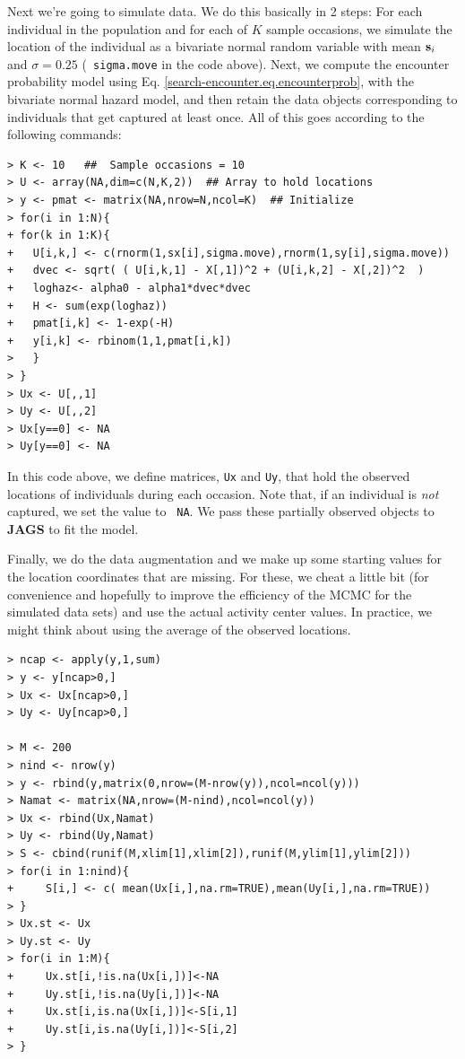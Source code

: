 Next we're going to simulate data. We do this basically in 2 steps:
For each individual in the population and for each of $K$ sample
occasions, we simulate the location of the individual as a bivariate
normal random variable with mean ${\bf s}_i$ and $\sigma = 0.25$ ({\tt
  sigma.move} in the code above). Next, we compute the encounter
probability model using Eq. \ref{search-encounter.eq.encounterprob},
with the bivariate normal hazard model, 
and then retain the data objects corresponding to individuals that get
captured at least once. All of this goes according to the following
commands: 
{\small
\begin{verbatim}
> K <- 10   ##  Sample occasions = 10
> U <- array(NA,dim=c(N,K,2))  ## Array to hold locations
> y <- pmat <- matrix(NA,nrow=N,ncol=K)  ## Initialize
> for(i in 1:N){
+ for(k in 1:K){
+   U[i,k,] <- c(rnorm(1,sx[i],sigma.move),rnorm(1,sy[i],sigma.move))
+   dvec <- sqrt( ( U[i,k,1] - X[,1])^2 + (U[i,k,2] - X[,2])^2  )
+   loghaz<- alpha0 - alpha1*dvec*dvec   
+   H <- sum(exp(loghaz))
+   pmat[i,k] <- 1-exp(-H)
+   y[i,k] <- rbinom(1,1,pmat[i,k])
>   }
> }
> Ux <- U[,,1]
> Uy <- U[,,2]
> Ux[y==0] <- NA
> Uy[y==0] <- NA
\end{verbatim}
}

In this code above, we define matrices, \mbox{\tt Ux} and
\mbox{\tt Uy}, that hold the 
observed locations of individuals during each occasion. Note that, if
an individual is {\it not} captured, we set the value to \mbox{\tt
  NA}. We pass these partially observed objects to {\bf JAGS} to fit
the model. 

Finally, we do the data augmentation and we make up some starting
values for the location coordinates that are missing. 
 For these, we
cheat a little bit (for convenience and hopefully to improve the
efficiency of the MCMC for the simulated data sets) and use the actual
activity center values. In practice, we might think about using the
average of the observed locations.
{\small
\begin{verbatim}
> ncap <- apply(y,1,sum)
> y <- y[ncap>0,]
> Ux <- Ux[ncap>0,]
> Uy <- Uy[ncap>0,]

> M <- 200
> nind <- nrow(y)
> y <- rbind(y,matrix(0,nrow=(M-nrow(y)),ncol=ncol(y)))
> Namat <- matrix(NA,nrow=(M-nind),ncol=ncol(y))
> Ux <- rbind(Ux,Namat)
> Uy <- rbind(Uy,Namat)
> S <- cbind(runif(M,xlim[1],xlim[2]),runif(M,ylim[1],ylim[2]))
> for(i in 1:nind){
+     S[i,] <- c( mean(Ux[i,],na.rm=TRUE),mean(Uy[i,],na.rm=TRUE))
> }
> Ux.st <- Ux
> Uy.st <- Uy
> for(i in 1:M){
+     Ux.st[i,!is.na(Ux[i,])]<-NA
+     Uy.st[i,!is.na(Uy[i,])]<-NA
+     Ux.st[i,is.na(Ux[i,])]<-S[i,1]
+     Uy.st[i,is.na(Uy[i,])]<-S[i,2]
> }
\end{verbatim}
}

